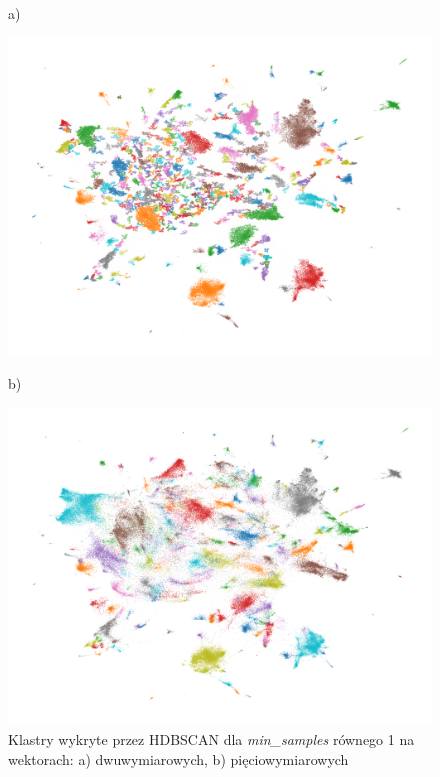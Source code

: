 	\begin{figure}[htb]
		\centering
		\begin{minipage}{.5\textwidth}
			a)\par\medskip %
			\includegraphics[width=\linewidth]{rys04/umap_15_100_1.png}
		\end{minipage}%
		\begin{minipage}{.5\textwidth}
			b)\par\medskip %
			\includegraphics[width=\linewidth]{rys04/umap_15_100_1_5d.png}
		\end{minipage}
		\caption[Klastry wykryte przez HDBSCAN]{Klastry wykryte przez HDBSCAN dla \emph{min\_samples} równego 1 na wektorach: a) dwuwymiarowych, b) pięciowymiarowych}\label{fig:hdbscan} %
	\end{figure}

